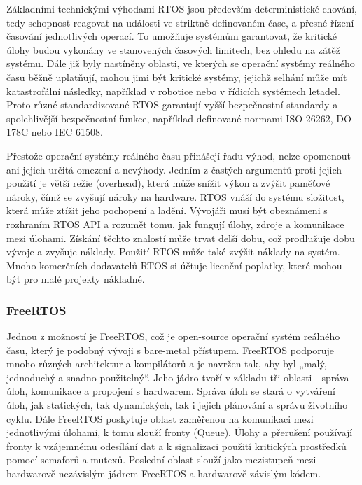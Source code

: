 Základními technickými výhodami RTOS jsou především deterministické chování, tedy schopnost reagovat na události ve striktně definovaném čase, a přesné řízení časování jednotlivých operací. To umožňuje systémům garantovat, že kritické úlohy budou vykonány ve stanovených časových limitech, bez ohledu na zátěž systému. Dále již byly nastíněny oblasti, ve kterých se operační systémy reálného času běžně uplatňují, mohou jimi být kritické systémy, jejichž selhání může mít katastrofální následky, například v robotice nebo v řídicích systémech letadel. Proto různé standardizované RTOS garantují vyšší bezpečnostní standardy a spolehlivější bezpečnostní funkce, například definované normami ISO 26262, DO-178C nebo IEC 61508.

Přestože operační systémy reálného času přinášejí řadu výhod, nelze opomenout ani jejich určitá omezení a nevýhody. Jedním z častých argumentů proti jejich použití je větší režie (overhead), která může snížit výkon a zvýšit paměťové nároky, čímž se zvyšují nároky na hardware. RTOS vnáší do systému složitost, která může ztížit jeho pochopení a ladění. Vývojáři musí být obeznámeni s rozhraním RTOS API a rozumět tomu, jak fungují úlohy, zdroje a komunikace mezi úlohami. Získání těchto znalostí může trvat delší dobu, což prodlužuje dobu vývoje a zvyšuje náklady. Použití RTOS může také zvýšit náklady na systém. Mnoho komerčních dodavatelů RTOS si účtuje licenční poplatky, které mohou být pro malé projekty nákladné.

\subsubsection{FreeRTOS}
Jednou z možností je FreeRTOS, což je open-source operační systém reálného času, který je podobný vývoji s bare-metal přístupem. FreeRTOS podporuje mnoho různých architektur a kompilátorů a je navržen tak, aby byl „malý, jednoduchý a snadno použitelný“. Jeho jádro tvoří v základu tři oblasti - správa úloh, komunikace a propojení s hardwarem. Správa úloh se stará o vytváření úloh, jak statických, tak dynamických, tak i jejich plánování a správu životního cyklu. Dále FreeRTOS poskytuje oblast zaměřenou na komunikaci mezi jednotlivými úlohami, k tomu slouží fronty (Queue). Úlohy a přerušení používají fronty k vzájemnému odesílání dat a k signalizaci použití kritických prostředků pomocí semaforů a mutexů. Poslední oblast slouží jako mezistupeň mezi hardwarově nezávislým jádrem FreeRTOS a hardwarově závislým kódem. \cite{the_architecture_of_open_source_applications}

